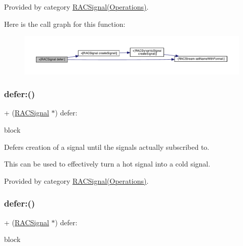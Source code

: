 Provided by category \mbox{\hyperlink{category_r_a_c_signal_07_operations_08_a3f29638c9c7f60928b7a6cbf2fe25d6f}{R\+A\+C\+Signal(\+Operations)}}.

Here is the call graph for this function\+:\nopagebreak
\begin{figure}[H]
\begin{center}
\leavevmode
\includegraphics[width=350pt]{interface_r_a_c_signal_a3f29638c9c7f60928b7a6cbf2fe25d6f_cgraph}
\end{center}
\end{figure}
\mbox{\label{interface_r_a_c_signal_a3f29638c9c7f60928b7a6cbf2fe25d6f}} 
\subsubsection{\texorpdfstring{defer\+:()}{defer:()}\hspace{0.1cm}{\footnotesize\ttfamily [2/3]}}
{\footnotesize\ttfamily + (\mbox{\hyperlink{interface_r_a_c_signal}{R\+A\+C\+Signal}} $\ast$) defer\+: \begin{DoxyParamCaption}\item[{(\mbox{\hyperlink{interface_r_a_c_signal}{R\+A\+C\+Signal}} $\ast$($^\wedge$)(void))}]{block }\end{DoxyParamCaption}}

Defers creation of a signal until the signal\textquotesingle{}s actually subscribed to.

This can be used to effectively turn a hot signal into a cold signal. 

Provided by category \mbox{\hyperlink{category_r_a_c_signal_07_operations_08_a3f29638c9c7f60928b7a6cbf2fe25d6f}{R\+A\+C\+Signal(\+Operations)}}.

\mbox{\label{interface_r_a_c_signal_a3f29638c9c7f60928b7a6cbf2fe25d6f}} 
\subsubsection{\texorpdfstring{defer\+:()}{defer:()}\hspace{0.1cm}{\footnotesize\ttfamily [3/3]}}
{\footnotesize\ttfamily + (\mbox{\hyperlink{interface_r_a_c_signal}{R\+A\+C\+Signal}} $\ast$) defer\+: \begin{DoxyParamCaption}\item[{(\mbox{\hyperlink{interface_r_a_c_signal}{R\+A\+C\+Signal}} $\ast$($^\wedge$)(void))}]{block }\end{DoxyParamCaption}}

